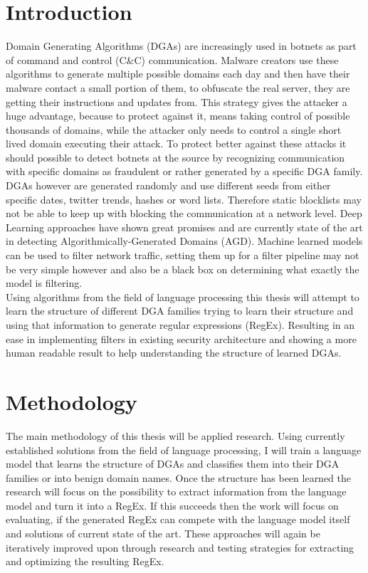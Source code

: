 \documentclass[a4paper, 12pt]{article}
\begin{document}
\section{Introduction}
Domain Generating Algorithms (DGAs) are increasingly used in botnets as part of
command and control (C\&C) communication. Malware creators use these algorithms
to generate multiple possible domains each day and then have their malware
contact a small portion of them, to obfuscate the real server, they are getting
their instructions and updates from. This strategy gives the attacker a huge
advantage, because to protect against it, means taking control of possible thousands
of domains, while the attacker only needs to control a single short lived domain
executing their attack. To protect better against these attacks it should possible to detect
botnets at the source by recognizing communication with specific domains as
fraudulent or rather generated by a specific DGA family. DGAs however are
generated randomly and use different seeds from either specific dates, twitter
trends, hashes or word lists. Therefore static blocklists may not be able to
keep up with blocking the communication at a network level. Deep Learning
approaches have shown great promises and are currently state of the art in
detecting Algorithmically-Generated Domains (AGD). 
Machine learned models can be used to filter network traffic, setting them up for a filter pipeline
may not be very simple however and also be a black box on determining what exactly the model is
filtering.\\
Using algorithms from the field of language processing this thesis will attempt to learn the
structure of different DGA families trying to learn their structure and using that information to
generate regular expressions (RegEx). Resulting in an ease in implementing filters in existing
security architecture and showing a more human readable result to help understanding the structure
of learned DGAs.

\section{Methodology}
The main methodology of this thesis will be applied research. Using currently established solutions
from the field of language processing, I will train a language model that learns the structure of
DGAs and classifies them into their DGA families or into benign domain names. Once the structure has
been learned the research will focus on the possibility to extract information from the language
model and turn it into a RegEx. If this succeeds then the work will focus on evaluating, if the
generated RegEx can compete with the language model itself and solutions of current state of the
art. These approaches will again be iteratively improved upon through research and testing
strategies for extracting and optimizing the resulting RegEx.
\end{document}
